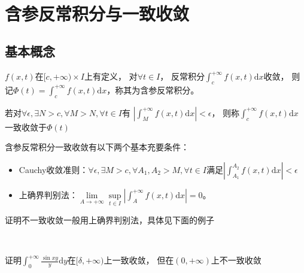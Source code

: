 ~






\section{含参反常积分与一致收敛}

\subsection{基本概念}

\begin{definition}[含参反常积分]
  $f(x,t)$在$[c,+\infty) \times I$上有定义，
  对$\forall t \in I$，
  反常积分$\int^{+\infty}_cf(x,t)\mathrm{d}x$收敛，
  则记$\Phi(t) = \int^{+\infty}_c f(x,t)\mathrm{d}x$，称其为含参反常积分。
\end{definition}

\begin{definition}[含参反常积分一致收敛]
  若对$\forall \epsilon, \exists N > c, \forall M > N, \forall t \in I$有
  $|\int^{+\infty}_M f(x,t) \mathrm{d}x | < \epsilon$，
  则称$\int^{+\infty}_c f(x,t)\mathrm{d}x$一致收敛于$\Phi(t)$
\end{definition}

\begin{theorem}[一致收敛基本充要条件]
  含参反常积分一致收敛有以下两个基本充要条件：
  \begin{itemize}
  \item Cauchy收敛准则：$\forall \epsilon, \exists M > c, \forall A_1,A_2 > M, \forall t \in I$满足$|\int_{A_1}^{A_2} f(x,t)\mathrm{d}x| < \epsilon$
  \item 上确界判别法：$\lim \limits _{A \rightarrow +\infty} \sup \limits _{t \in I}|\int_A^{+\infty}f(x,t)\mathrm{d}x| = 0$。
  \end{itemize}
\end{theorem}

\begin{note}
  证明不一致收敛一般用上确界判别法，具体见下面的例子
\end{note}

~

\begin{exercise}
  证明$\int_0^{+\infty} \frac{\sin xy}{y}\mathrm{d} y$在$[\delta, +\infty)$上一致收敛，
  但在$(0,+\infty)$上不一致收敛
\end{exercise}

